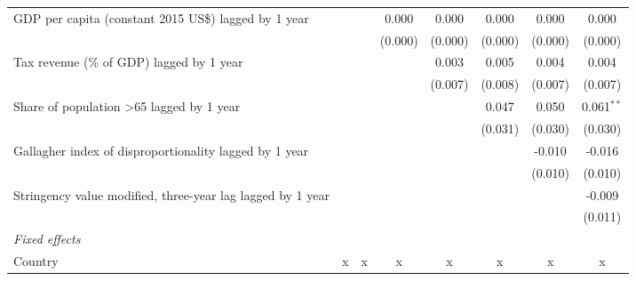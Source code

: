 \begin{tabular}{lccccccc}
   GDP per capita (constant 2015 US\$) lagged by 1 year                             &               &               & 0.000         & 0.000         & 0.000         & 0.000         & 0.000\\   
                                                                                    &               &               & (0.000)       & (0.000)       & (0.000)       & (0.000)       & (0.000)\\   
   Tax revenue (\% of GDP) lagged by 1 year                                         &               &               &               & 0.003         & 0.005         & 0.004         & 0.004\\   
                                                                                    &               &               &               & (0.007)       & (0.008)       & (0.007)       & (0.007)\\   
   Share of population >65 lagged by 1 year                                         &               &               &               &               & 0.047         & 0.050         & 0.061$^{**}$\\   
                                                                                    &               &               &               &               & (0.031)       & (0.030)       & (0.030)\\   
   Gallagher index of disproportionality lagged by 1 year                           &               &               &               &               &               & -0.010        & -0.016\\   
                                                                                    &               &               &               &               &               & (0.010)       & (0.010)\\   
   Stringency value modified, three-year lag lagged by 1 year                       &               &               &               &               &               &               & -0.009\\   
                                                                                    &               &               &               &               &               &               & (0.011)\\   
   \emph{Fixed effects}\\
   Country                                                                          & x             & x             & x             & x             & x             & x             & x\\  

\end{tabular}
